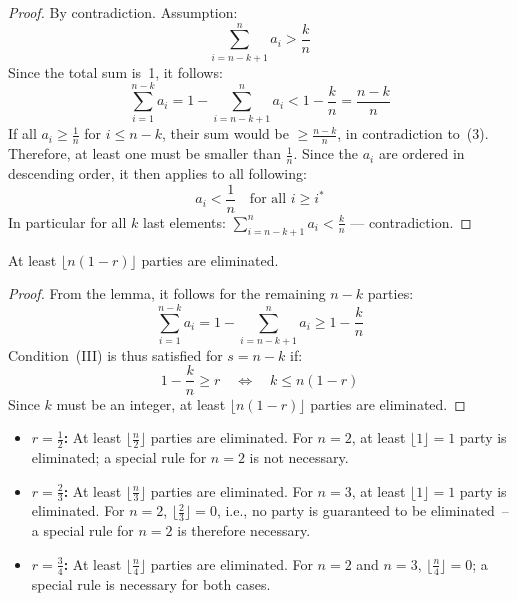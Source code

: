 \begin{proof}
  By contradiction. Assumption:
\begin{equation}
  \sum_{i=n-k+1}^{n} a_i > \frac{k}{n}
\end{equation}
Since the total sum is~1, it follows:
\begin{equation}
  \sum_{i=1}^{n-k} a_i = 1 - \sum_{i=n-k+1}^{n} a_i < 1 - \frac{k}{n} = \frac{n-k}{n}
\end{equation}
If all $a_i \geq \frac{1}{n}$ for $i \leq n-k$, their sum would be $\geq \frac{n-k}{n}$,
in contradiction to~(3). Therefore, at least one must be smaller than $\frac{1}{n}$. Since the
$a_i$ are ordered in descending order, it then applies to all following:
\begin{equation}
  a_i < \frac{1}{n} \quad \text{for all } i \geq i^*
\end{equation}
In particular for all $k$ last elements: $\displaystyle\sum_{i=n-k+1}^{n} a_i < \frac{k}{n}$
--- contradiction.
\end{proof}

\begin{maintheorem}
At least $\lfloor n(1-r) \rfloor$ parties are eliminated.
\end{maintheorem}

\begin{proof}
From the lemma, it follows for the remaining $n-k$ parties:
\begin{equation}
  \sum_{i=1}^{n-k} a_i = 1 - \sum_{i=n-k+1}^{n} a_i \geq 1 - \frac{k}{n}
\end{equation}
Condition~(III) is thus satisfied for $s = n-k$ if:
\begin{equation}
  1 - \frac{k}{n} \geq r \quad \Longleftrightarrow \quad k \leq n(1-r)
\end{equation}
Since $k$ must be an integer, at least $\lfloor n(1-r) \rfloor$ parties are eliminated.
\end{proof}


\begin{itemize}
  \item \textbf{$r = \frac{1}{2}$:} At least $\lfloor \frac{n}{2} \rfloor$
    parties are eliminated. For $n = 2$, at least $\lfloor 1 \rfloor = 1$ party is eliminated; a
    special rule for $n = 2$ is not necessary.

  \item \textbf{$r = \frac{2}{3}$:} At least $\lfloor \frac{n}{3} \rfloor$
    parties are eliminated. For $n = 3$, at least $\lfloor 1 \rfloor = 1$ party is eliminated.
    For $n = 2$, $\lfloor \frac{2}{3} \rfloor = 0$, i.e., no party is
    guaranteed to be eliminated~-- a special rule for $n = 2$ is therefore necessary.

  \item \textbf{$r = \frac{3}{4}$:} At least $\lfloor \frac{n}{4} \rfloor$
    parties are eliminated. For $n = 2$ and $n = 3$, $\lfloor \frac{n}{4} \rfloor = 0$; a
    special rule is necessary for both cases.
\end{itemize}

